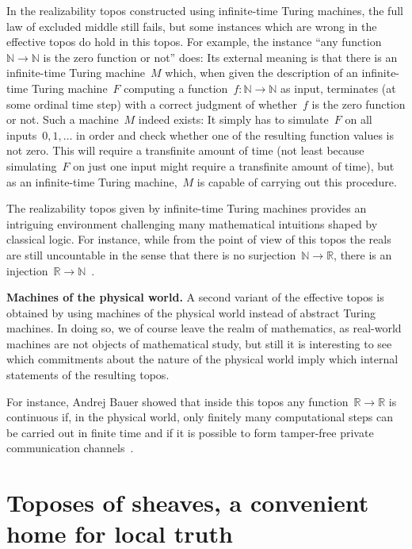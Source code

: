 \documentclass[oneside,reqno]{amsart}
\theoremstyle{definition}
\theoremstyle{plain}
\theoremstyle{remark}
\newcommand{\NN}{\mathbb{N}}
\newcommand{\RR}{\mathbb{R}}
\renewcommand{\_}{\mathpunct{.}\,}
\newcommand{\effective}{ef{}fective\xspace}
\newcommand{\?}{\,{:}\,}
\renewcommand{\paragraph}[1]{\noindent\textbf{#1.}}
\begin{document}
In the realizability topos constructed using infinite-time Turing machines, the full
law of excluded middle still fails, but some instances which are wrong in the
\effective topos do hold in this topos. For example, the instance ``any
function~$\NN \to \NN$ is the zero function or not'' does: Its external meaning
is that there is an infinite-time Turing machine~$M$ which, when given the
description of an infinite-time Turing machine~$F$ computing a function~$f :
\NN \to \NN$ as input, terminates (at some ordinal time step) with a correct
judgment of whether~$f$ is the zero function or not. Such a machine~$M$ indeed
exists: It simply has to simulate~$F$ on all inputs~$0,1,\ldots$ in order and
check whether one of the resulting function values is not zero. This
will require a transfinite amount of time (not least because simulating~$F$ on
just one input might require a transfinite amount of time), but as an
infinite-time Turing machine,~$M$ is capable of carrying out this procedure.

The realizability topos given by infinite-time Turing machines provides an intriguing environment challenging many
mathematical intuitions shaped by classical logic. For instance, while from the
point of view of this topos the reals are still uncountable in the sense that
there is no surjection~$\NN \to \RR$, there is an injection~$\RR \to
\NN$~\cite{bauer:injection}.

\bigskip
\paragraph{Machines of the physical world} A second variant of the
\effective topos is obtained by using machines of the physical world
instead of abstract Turing machines. In doing so, we of
course leave the realm of mathematics, as real-world machines are not objects
of mathematical study, but still it is interesting to see which commitments
about the nature of the physical world imply which internal statements of the
resulting topos.

For instance, Andrej Bauer showed that inside this topos any function~$\RR \to
\RR$ is continuous if, in the physical world, only finitely many computational
steps can be carried out in finite time and if it is possible to form
tamper-free private communication channels~\cite{bauer:int-mathematics}.


\section{Toposes of sheaves, a convenient home for local truth}
\label{sect:sheaf-toposes}
\end{document}
